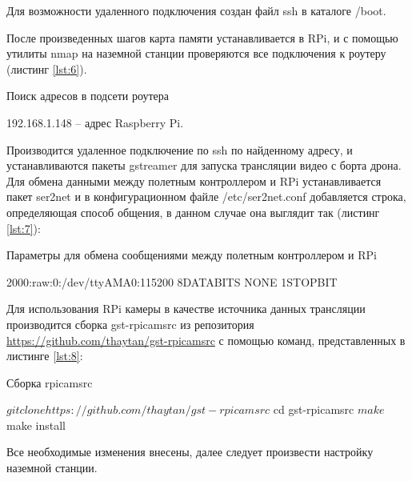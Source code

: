 Для возможности удаленного подключения создан файл ssh в каталоге /boot.

После произведенных шагов карта памяти устанавливается в RPi, и с помощью утилиты nmap на наземной станции проверяются все подключения к роутеру (листинг \ref{lst:6}).
\begin{Program}[H]
	\caption{Поиск адресов в подсети роутера} \label{lst:6}
\end{Program}

192.168.1.148 -- адрес Raspberry Pi.

Производится удаленное подключение по ssh по найденному адресу, и устанавливаются пакеты gstreamer для запуска трансляции видео с борта дрона.
Для обмена данными между полетным контроллером и RPi устанавливается пакет ser2net и в конфигурационном файле /etc/ser2net.conf добавляется строка, определяющая способ общения, в данном случае она выглядит так (листинг \ref{lst:7}):
\begin{Program}[H]
\caption{Параметры для обмена сообщениями между полетным контроллером и RPi} \label{lst:7}
	\begin{MyCode}
	2000:raw:0:/dev/ttyAMA0:115200 8DATABITS NONE 1STOPBIT
	\end{MyCode}
\end{Program}

Для использования RPi камеры в качестве источника данных трансляции производится сборка gst-rpicamsrc из репозитория \url{https://github.com/thaytan/gst-rpicamsrc} с помощью команд, представленных в листинге \ref{lst:8}:
\begin{Program}[H]
\caption{Сборка rpicamsrc} \label{lst:8}
	\begin{MyCode}
	$ git clone https://github.com/thaytan/gst-rpicamsrc
	$ cd gst-rpicamsrc
	$ make
	$ make install
	\end{MyCode}
\end{Program}

Все необходимые изменения внесены, далее следует произвести настройку наземной станции.

